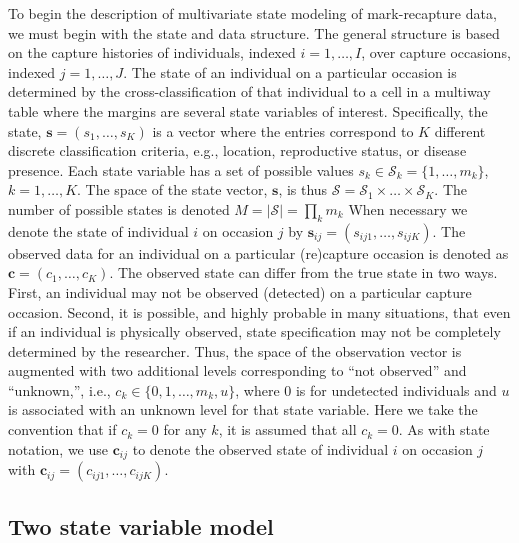 \documentclass[fleqn]{article}
\newcommand{\bs}{\ensuremath{\mathbf{s}}}
\newcommand{\bc}{\ensuremath{\mathbf{c}}}
\newcommand{\fS}{\ensuremath{\mathcal{S}}}
\begin{document}
To begin the description of multivariate state modeling of mark-recapture data, we must begin with the state and data structure. The general structure is based on the capture histories of individuals, indexed $i=1,\dots,I$, over capture occasions, indexed $j=1,\dots,J$. The state of an individual on a particular occasion is determined by the cross-classification of that individual to a cell in a multiway table where the margins are several state variables of interest. Specifically, the state, $\bs = (s_1,\dots,s_K)$ is a vector where the entries correspond to $K$ different discrete classification criteria, e.g., location, reproductive status, or disease presence. Each state variable has a set of possible values $s_k \in \fS_k=\{1,\dots,m_k\}$, $k=1,\dots,K$. The space of the state vector, $\bs$, is thus $\fS = \fS_1 \times \dots \times \fS_K$. The number of possible states is denoted $M = |\fS|=\prod_k m_k$ When necessary we denote the state of individual $i$ on occasion $j$ by $\bs_{ij}=(s_{ij1},\dots,s_{ijK})$. The observed data for an individual on a particular (re)capture occasion is denoted as $\bc = (c_1,\dots,c_K)$. The observed state can differ from the true state in two ways. First, an individual may not be observed (detected) on a particular capture occasion. Second, it is possible, and highly probable in many situations, that even if an individual is physically observed, state specification may not be completely determined by the researcher. Thus, the space of the observation vector is augmented with two additional levels corresponding to ``not observed'' and ``unknown,'', i.e., $c_k \in \{0,1,\dots,m_k,u\}$, where 0 is for undetected individuals and $u$ is associated with an unknown level for that state variable. Here we take the convention that if $c_k=0$ for any $k$, it is assumed that all $c_k=0$. As with state notation, we use $\bc_{ij}$ to denote the observed state of individual $i$ on occasion $j$ with $\bc_{ij}=(c_{ij1},\dots,c_{ijK})$.


\subsection{Two state variable model}
\end{document}

